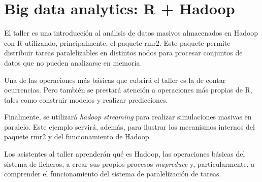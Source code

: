 \chapter{Big data analytics: R + Hadoop}




El taller es una introducción al análisis de datos masivos almacenados
en Hadoop con R utilizando, principalmente, el paquete rmr2. Este
paquete permite distribuir tareas paralelizables en distintos nodos
para procesar conjuntos de datos que no pueden analizarse en memoria.

Una de las operaciones más básicas que cubrirá el taller es la de
contar ocurrencias. Pero también se prestará atención a operaciones
más propias de R, tales como construir modelos y realizar
predicciones.

Finalmente, se utilizará \textit{hadoop streaming} para realizar
simulaciones masivas en paralelo. Este ejemplo servirá, además, para
ilustrar los mecanismos internos del paquete rmr2 y del funcionamiento
de Hadoop.

Los asistentes al taller aprenderán qué es Hadoop, las operaciones
básicas del sistema de ficheros, a crear sus propios procesos
\textit{mapreduce} y, particularmente, a comprender el funcionamiento
del sistema de paralelización de tareas.


%

%
